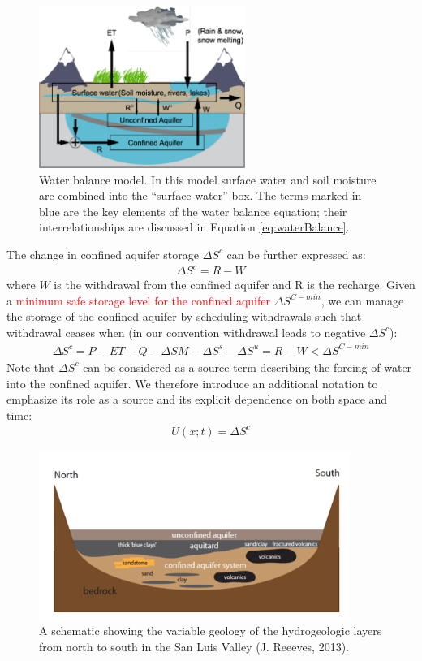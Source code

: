 \begin{figure}
\noindent\includegraphics[width=0.6\textwidth]{Figures/watercycle.pdf}
\caption{Water balance model. In this model surface water and soil moisture are combined into the “surface water” box.  The terms marked in blue are the key elements of the water balance equation; their interrelationships are discussed in Equation \ref{eq:waterBalance}.}
\label{fig:watercycle}
\end{figure}

The change in confined aquifer storage $\Delta S^c$ can be further expressed as:
\begin{align}
\Delta S^c = R - W
\label{eq:confinedStorage}  
\end{align}
where $W$ is the withdrawal from the confined aquifer and R is the recharge. Given a \textcolor{red}{minimum safe storage level for the confined aquifer} $\Delta S^{C-min}$, we can manage the storage of the confined aquifer by scheduling withdrawals such that withdrawal ceases when (in our convention withdrawal leads to negative $\Delta S^c$):
\begin{align}
\Delta S^c = P-ET-Q-\Delta SM - \Delta S^s - \Delta S^u = R-W < \Delta S^{C-min}
\label{eq:safelimit}  
\end{align}
Note that $\Delta S^c$  can be considered as a source term describing the forcing of water into the confined aquifer.  We therefore introduce an additional notation to emphasize its role as a source and its explicit dependence on both space and time:
\begin{align}
U(x;t) = \Delta S^c
\label{eq:force}  
\end{align}

\begin{figure}
\noindent\includegraphics[width=0.9\textwidth]{Figures/SLVaquifers.png}
\caption{A schematic showing the variable geology of the hydrogeologic layers from north to south in the San Luis Valley (J. Reeeves, 2013).}
\label{fig:slv-aquifers}
\end{figure}